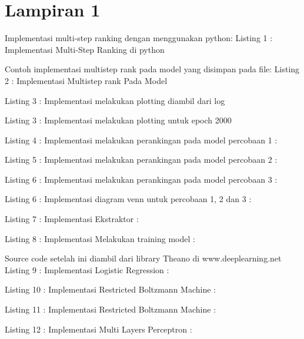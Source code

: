 \chapter*{Lampiran 1}

Implementasi multi-step ranking dengan menggunakan python:
Listing 1 : Implementasi Multi-Step Ranking di python


Contoh implementasi multistep rank pada model yang disimpan pada file: 
Listing 2 : Implementasi Multistep rank Pada Model


Listing 3 : Implementasi melakukan plotting diambil dari log


Listing 3 : Implementasi melakukan plotting untuk epoch 2000


Listing 4 : Implementasi melakukan perankingan pada model percobaan 1 :


Listing 5 : Implementasi melakukan perankingan pada model percobaan 2 :


Listing 6 : Implementasi melakukan perankingan pada model percobaan 3 :


Listing 6 : Implementasi diagram venn untuk percobaan 1, 2 dan 3 :


Listing 7 : Implementasi Ekstraktor :


Listing 8 : Implementasi Melakukan training model :


Source code setelah ini diambil dari library Theano di www.deeplearning.net \\

Listing 9 : Implementasi Logistic Regression :


Listing 10 : Implementasi Restricted Boltzmann Machine :


Listing 11 : Implementasi Restricted Boltzmann Machine :


Listing 12 : Implementasi Multi Layers Perceptron :



